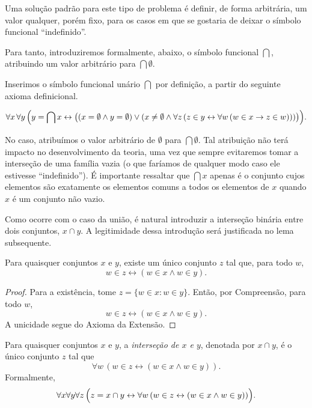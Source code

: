 Uma solução padrão para este tipo de problema é definir, de forma arbitrária, um valor qualquer, porém fixo, para os casos em que se gostaria de deixar o símbolo funcional ``indefinido''.

Para tanto, introduziremos formalmente, abaixo, o símbolo funcional $\bigcap$, atribuindo um valor arbitrário para $\bigcap \emptyset$.

\begin{definition}[$\BST$]\label{def:simboloIntersecao}
    Inserimos o símbolo funcional unário $\bigcap$ por definição, a partir do seguinte axioma definicional.

    \[
    \forall x\, \forall y\,
    \Bigl(
    y = \bigcap x \leftrightarrow
    \bigl(
    (x = \emptyset \land y = \emptyset)
    \lor
    (x \neq \emptyset \land \forall z\, (z \in y \leftrightarrow \forall w\, (w \in x \rightarrow z \in w)))
    \bigr)
    \Bigr).
    \]
\end{definition}

No caso, atribuímos o valor arbitrário de $\emptyset$ para $\bigcap \emptyset$.
Tal atribuição não terá impacto no desenvolvimento da teoria, uma vez que sempre evitaremos tomar a interseção de uma família vazia (o que faríamos de qualquer modo caso ele estivesse ``indefinido'').
É importante ressaltar que $\bigcap x$ apenas é o conjunto cujos elementos são exatamente os elementos comuns a todos os elementos de $x$ quando $x$ é um conjunto não vazio.

Como ocorre com o caso da união, é natural introduzir a interseção binária entre dois conjuntos, $x\cap y$.
A legitimidade dessa introdução será justificada no lema subsequente.

\begin{lemma}[$\BST$]\label{lem:existenciaDaIntersecaoBinaria}
    Para quaisquer conjuntos $x$ e $y$, existe um único conjunto $z$ tal que, para todo $w$,
    \[
        w\in z \leftrightarrow (w\in x \land w\in y).
    \]
\end{lemma}
\begin{proof}
    Para a existência, tome $z=\{w\in x : w\in y\}$.
    Então, por Compreensão, para todo $w$,
    \[
        w\in z \leftrightarrow (w\in x\land w\in y).
    \]
    A unicidade segue do Axioma da Extensão.
\end{proof}

\begin{definition}[$\BST$]\label{def:intersecaoBinaria}
    Para quaisquer conjuntos $x$ e $y$, a \emph{interseção de $x$ e $y$}, denotada por $x\cap y$, é o único conjunto $z$ tal que
    \[
        \forall w\, (w\in z \leftrightarrow (w\in x\land w\in y)).
    \]
    Formalmente,
    \[
        \forall x\forall y\forall z\,
        \Bigl(z=x\cap y \leftrightarrow
        \forall w\, (w\in z \leftrightarrow (w\in x\land w\in y))\Bigr).
    \]
\end{definition}
